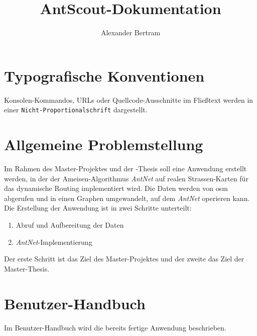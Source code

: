 \documentclass[
  a4paper,
  10pt
]{scrreprt}
\title{AntScout-Dokumentation}
\author{Alexander Bertram}
\begin{document}
\maketitle



\printglossary[
  title = Abkürzungsverzeichnis,
  toctitle = Abkürzungsverzeichnis
]

\chapter{Typografische Konventionen}
\label{chap:typografische-konventionen}

Konsolen-Kommandos, URLs oder Quellcode-Ausschnitte im Fließtext werden in einer \texttt{Nicht-Proportionalschrift} dargestellt.

\chapter{Allgemeine Problemstellung}
\label{chap:allgemeine-problemstellung}

Im Rahmen des Master-Projektes und der -Thesis soll eine Anwendung erstellt werden, in der der Ameisen-Algorithmus \textit{AntNet} auf realen Strassen-Karten für das dynamische Routing implementiert wird.
Die Daten werden von \gls{osm} abgerufen und in einen Graphen umgewandelt, auf dem \textit{AntNet} operieren kann.
Die Erstellung der Anwendung ist in zwei Schritte unterteilt:

\begin{enumerate}
  \item Abruf und Aufbereitung der Daten
  \item \textit{AntNet}-Implementierung
\end{enumerate}

Der erste Schritt ist das Ziel des Master-Projektes und der zweite das Ziel der Master-Thesis.

\chapter{Benutzer-Handbuch}
\label{chap:benutzer-handbuch}

Im Benutzer-Handbuch wird die bereits fertige Anwendung beschrieben.

\end{document}

